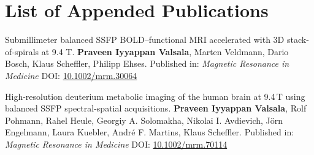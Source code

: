 \chapter{List of Appended Publications}\label{chap:LOP}

\begin{enumerate}[label={[\arabic*]}]

\item Submillimeter balanced SSFP BOLD–functional MRI  accelerated with 3D stack-of-spirals at 9.4 T.\newline
\normalsize \textbf{Praveen Iyyappan Valsala}, Marten Veldmann, Dario Bosch,  Klaus Scheffler, \newline Philipp Ehses.\newline
Published in: \textit{Magnetic Resonance in Medicine} \newline
DOI: \href{https://doi.org/10.1002/mrm.30064}{10.1002/mrm.30064}

\item High-resolution deuterium metabolic imaging of the human brain at 9.4\,T using balanced SSFP spectral-spatial acquisitions.\newline
\normalsize \textbf{Praveen Iyyappan Valsala}, Rolf Pohmann, Rahel Heule, Georgiy A. Solomakha, \newline Nikolai I. Avdievich, Jörn Engelmann, Laura Kuebler, André F. Martins, Klaus Scheffler.\newline
Published in: \textit{Magnetic Resonance in Medicine}\newline
DOI: \href{https://doi.org/10.1002/mrm.70114}{10.1002/mrm.70114}

\end{enumerate}


